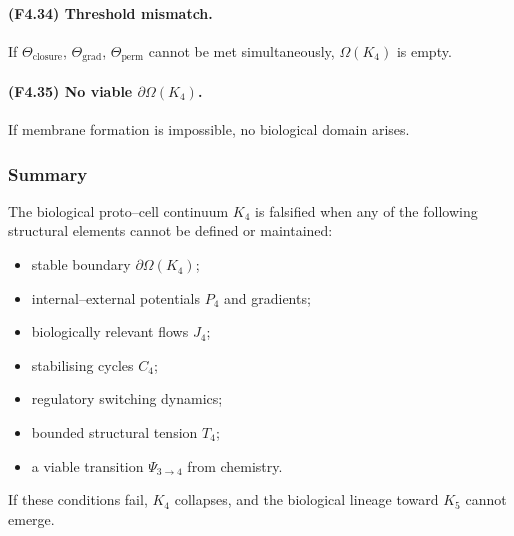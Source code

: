 \paragraph{(F4.34) Threshold mismatch.}
If $\Theta_{\mathrm{closure}}$, $\Theta_{\mathrm{grad}}$,
$\Theta_{\mathrm{perm}}$ cannot be met simultaneously,
$\Omega(K_4)$ is empty.

\paragraph{(F4.35) No viable \texorpdfstring{$\partial\Omega(K_4)$}{\partial\Omega(K_4)}.}
If membrane formation is impossible, no biological domain arises.



\subsubsection{Summary}

The biological proto–cell continuum $K_4$ is falsified when any of the
following structural elements cannot be defined or maintained:

\begin{itemize}
    \item stable boundary $\partial\Omega(K_4)$;
    \item internal–external potentials $P_4$ and gradients;
    \item biologically relevant flows $J_4$;
    \item stabilising cycles $C_4$;
    \item regulatory switching dynamics;
    \item bounded structural tension $T_4$;
    \item a viable transition $\Psi_{3\to 4}$ from chemistry.
\end{itemize}

If these conditions fail, $K_4$ collapses, and the biological lineage
toward $K_5$ cannot emerge.

